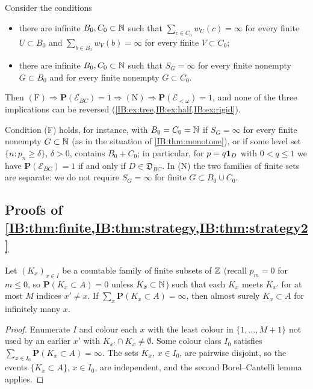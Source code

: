 \begin{theorem}
\label{IB:thm:hierarchy}
Consider the conditions
\begin{itemize}
\item[(F)] there are infinite $B_0,C_0\subset\mathbb{N}$ such that $\sum_{c\in C_0}w_U(c)=\infty$ for every
finite $U\subset B_0$ and $\sum_{b\in B_0}w_V(b)=\infty$ for every finite $V\subset C_0$;
\item[(N)] there are infinite $B_0,C_0\subset\mathbb{N}$ such that $S_G=\infty$ for every finite nonempty
$G\subset B_0$ and for every finite nonempty $G\subset C_0$.
\end{itemize}
Then $\mathrm{(F)}\Rightarrow\mathbf P(\mathcal E_{BC})=1\Rightarrow\mathrm{(N)}\Rightarrow\mathbf P(\mathcal E_{<\omega})=1$,
and none of the three implications can be reversed
(\cref{IB:ex:tree,IB:ex:half,IB:ex:rigid}).
\end{theorem}

Condition (F) holds, for instance, with $B_0=C_0=\mathbb{N}$ if $S_G=\infty$ for every finite
nonempty $G\subset\mathbb{N}$ (as in the situation of \cref{IB:thm:monotone}), or if some level set
$\{n:p_n\ge\delta\}$, $\delta>0$, contains $B_0+C_0$; in particular, for $p=q\mathbf{1}_D$ with
$0<q\le1$ we have $\mathbf P(\mathcal E_{BC})=1$ if and only if $D\in\mathfrak D_{BC}$. In (N) the
two families of finite sets are separate: we do not require $S_G=\infty$ for finite
$G\subset B_0\cup C_0$.

\subsection{Proofs of \texorpdfstring{\cref{IB:thm:finite,IB:thm:strategy,IB:thm:strategy2}}{the criteria}}
\label{IB:ss:proofsAB}

\begin{lemma}
\label{IB:lem:BC}
Let $(K_x)_{x\in I}$ be a countable family of finite subsets of $\mathbb{Z}$ \textup{(}recall $p_m=0$
for $m\le0$, so $\mathbf P(K_x\subset A)=0$ unless $K_x\subset\mathbb{N}$\textup{)} such that each
$K_x$ meets $K_{x'}$ for at most $M$ indices $x'\ne x$. If
$\sum_x\mathbf P(K_x\subset A)=\infty$, then almost surely $K_x\subset A$ for infinitely many $x$.
\end{lemma}

\begin{proof}
Enumerate $I$ and colour each $x$ with the least colour in $\{1,\dots,M+1\}$ not used by
an earlier $x'$ with $K_{x'}\cap K_x\ne\emptyset$. Some colour class $I_0$ satisfies
$\sum_{x\in I_0}\mathbf P(K_x\subset A)=\infty$. The sets $K_x$, $x\in I_0$, are pairwise disjoint,
so the events $\{K_x\subset A\}$, $x\in I_0$, are independent, and the second
Borel--Cantelli lemma applies.
\end{proof}

